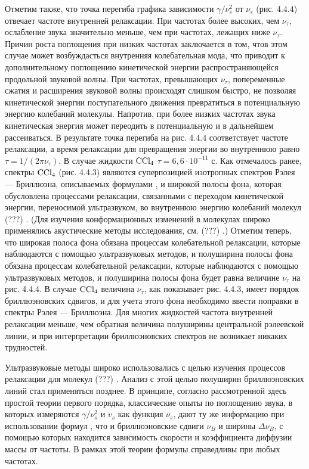 {Отметим также, что точка перегиба графика зависимости
$\gamma/\nu_s^2$ от $\nu_s$ (рис. 4.4.4) отвечает частоте
внутренней релаксации. При частотах более высоких, чем
$\nu_{\tau}$, ослабление звука значительно меньше, чем при
частотах, лежащих ниже $\nu_{\tau}$. Причин роста поглощения при
низких частотах заключается в том, чтов этом случае может
возбуждасться внутренняя колебательная мода, что приводит к
дополнительному поглощению кинетической энергии
распространяющейся продольной звуковой волны. При частотах,
превышающих $\nu_{\tau}$, попеременные сжатия и расширения
звуковой волны происходят слишком быстро, не позволяя
кинетической энергии поступательного движения превратиться в
потенциальную энергию колебаний молекулы. Напротив, при более
низких частотах звука кинетическая энергия может переодить в
потенциальную и в дальнейшем рассеиваться. В результате точка
перегиба на рис. 4.4.4 соответствует частоте релаксации, а время
релаксации для превращения энергии во внутреннюю равно
$\tau=1/(2\pi\nu_{\tau})$. В случае жидкости $\rm CCl_4$
$\tau=6,6\cdot10^{-11}$ с. Как отмечалось ранее, спектры $\rm
CCl_4$ (рис. 4.4.3) являются суперпозицией изотропных спектров
Рэлея --- Бриллюэна, описываемых формулами , и широкой
полосы фона, которая обусловлена процессами релаксации,
связанными с переходом кинетической энергии, переносимой
ультразвуком, во внутреннюю энергию колебаний молекул  (???) . (Для
изучения конформационных изменений в молекулах широко применялись
акустические методы исследования, см.  (???) .) Отметим теперь, что
широкая полоса фона обязана процессам колебательной релаксации,
которые наблюдаются с помощью ультразвуковых методов, и
полуширина полосы фона обязана процессам колебательной
релаксации, которые наблюдаются с помощью ультразвуковых методов,
и полуширина полосы фона будет равна величине $\nu_{\tau}$ на
рис. 4.4.4. В случае $\rm CCl_4$ величина $\nu_{\tau}$, как
показывает рис. 4.4.3, имеет порядок бриллюэновских сдвигов, и
для учета этого фона необходимо ввести поправки в спектры Рэлея
--- Бриллюэна. Для многих жидкостей частота внутренней релаксации
меньше, чем обратная величина полуширины центральной рэлеевской
линии, и при интерпретации бриллюэновских спектров не возникает
никаких трудностей.

Ультразвуковые методы широко использовались с целью изучения
процессов релаксации для молекул  (???) . Анализ с этой целью
полуширин бриллюэновских линий стал применяться позднее. В
принципе, согласно рассмотренной здесь простой теории первого
порядка, классические опыты по поглощению звука, в которых
измеряются $\gamma/\nu_s^2$ и $v_s$ как функция $\nu_s$, дают ту
же информацию при использовании формул , что и
бриллюэновские сдвиги $\nu_B$ и ширины $\Delta\nu_B$,  с помощью
которых находится зависимость скорости и коэффициента диффузии
массы от частоты. В рамках этой теории формулы 
справедливы при любых частотах.

}
